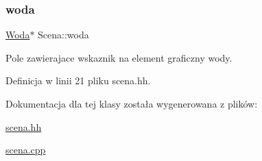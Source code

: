 \subsubsection{\texorpdfstring{woda}{woda}}
{\footnotesize\ttfamily \mbox{\hyperlink{class_woda}{Woda}}$\ast$ Scena\+::woda\hspace{0.3cm}{\ttfamily [private]}}

Pole zawierajace wskaznik na element graficzny wody. 

Definicja w linii 21 pliku scena.\+hh.



Dokumentacja dla tej klasy została wygenerowana z plików\+:\begin{DoxyCompactItemize}
\item 
\mbox{\hyperlink{scena_8hh}{scena.\+hh}}\item 
\mbox{\hyperlink{scena_8cpp}{scena.\+cpp}}\end{DoxyCompactItemize}

